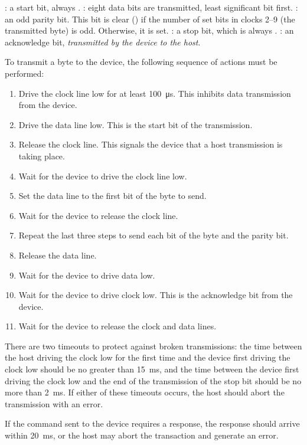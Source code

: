 \begin{description}
: a start bit, always .
: eight data bits are transmitted, least significant bit first.
: an odd parity bit. This bit is clear () if the number of
set bits in clocks 2–9 (the transmitted byte) is odd. Otherwise, it is set.
: a stop bit, which is always .
: an acknowledge bit, {\em transmitted by the device to the host}.
\end{description}

To transmit a byte to the device, the following sequence of actions must be
performed:

\begin{enumerate}
\item Drive the clock line low for at least 100~μs. This inhibits data
transmission from the device.
\item Drive the data line low. This is the start bit of the transmission.
\item Release the clock line. This signals the device that a host transmission
  is taking place. 
\item Wait for the device to drive the clock line low.
\item Set the data line to the first bit of the byte to send.
\item Wait for the device to release the clock line.
\item Repeat the last three steps to send each bit of the byte and the parity bit.
\item Release the data line.
\item Wait for the device to drive data low.
\item Wait for the device to drive clock low. This is the acknowledge bit from the device.
\item Wait for the device to release the clock and data lines.
\end{enumerate}

There are two timeouts to protect against broken transmissions: the time
between the host driving the clock low for the first time and the device first
driving the clock low should be no greater than 15~ms, and the time between the
device first driving the clock low and the end of the transmission of the stop
bit should be no more than 2~ms. If either of these timeouts occurs, the host
should abort the transmission with an error.

If the command sent to the device requires a response, the response should
arrive within 20~ms, or the host may abort the transaction and generate an
error.

